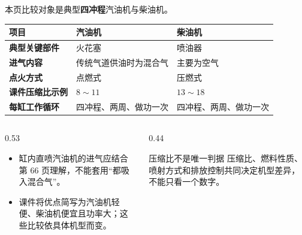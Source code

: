\begin{frame}[t,shrink]{}
本页比较对象是典型\textbf{四冲程}汽油机与柴油机。
\begin{smalltab}
\begin{tabularx}{\linewidth}{@{}>{\bfseries}p{30mm}XX@{}}
  \toprule
  项目 & 汽油机 & 柴油机\\
  \midrule
  典型关键部件 & 火花塞 & 喷油器\\
  进气内容 & 传统气道供油时为混合气 & 主要为空气\\
  点火方式 & 点燃式 & 压燃式\\
  课件压缩比示例 & \(8\sim11\) & \(13\sim18\)\\
  每缸工作循环 & 四冲程、两周、做功一次 & 四冲程、两周、做功一次\\
  \bottomrule
\end{tabularx}
\end{smalltab}
\begin{columns}[T,onlytextwidth]
\begin{column}{0.53\textwidth}
  \begin{itemize}
    \item 缸内直喷汽油机的进气应结合第 66 页理解，不能套用“都吸入混合气”。
    \item 课件将优点简写为汽油机轻便、柴油机便宜且功率大；这些比较依具体机型而变。
  \end{itemize}
\end{column}
\begin{column}{0.44\textwidth}
  \begin{amberbox}{压缩比不是唯一判据}
  \small 压缩比、燃料性质、喷射方式和排放控制共同决定机型差异，不能只看一个数字。
  \end{amberbox}
\end{column}
\end{columns}
\end{frame}

